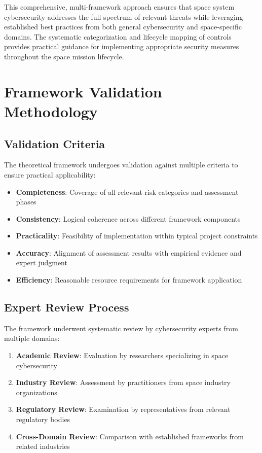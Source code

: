 \documentclass[binding=0.6cm]{sapthesis}
\begin{document}
This comprehensive, multi-framework approach ensures that space system cybersecurity addresses the full spectrum of relevant threats while leveraging established best practices from both general cybersecurity and space-specific domains. The systematic categorization and lifecycle mapping of controls provides practical guidance for implementing appropriate security measures throughout the space mission lifecycle.


\section{Framework Validation Methodology}

\subsection{Validation Criteria}

The theoretical framework undergoes validation against multiple criteria to ensure practical applicability:

\begin{itemize}
    \item \textbf{Completeness}: Coverage of all relevant risk categories and assessment phases
    \item \textbf{Consistency}: Logical coherence across different framework components
    \item \textbf{Practicality}: Feasibility of implementation within typical project constraints
    \item \textbf{Accuracy}: Alignment of assessment results with empirical evidence and expert judgment
    \item \textbf{Efficiency}: Reasonable resource requirements for framework application
\end{itemize}

\subsection{Expert Review Process}

The framework underwent systematic review by cybersecurity experts from multiple domains:

\begin{enumerate}
    \item \textbf{Academic Review}: Evaluation by researchers specializing in space cybersecurity
    \item \textbf{Industry Review}: Assessment by practitioners from space industry organizations
    \item \textbf{Regulatory Review}: Examination by representatives from relevant regulatory bodies
    \item \textbf{Cross-Domain Review}: Comparison with established frameworks from related industries
\end{enumerate}
\end{document}
